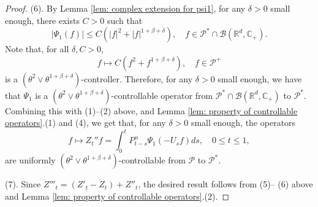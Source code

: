 \documentclass[12pt,a4paper]{amsart}
\theoremstyle{plain}
\theoremstyle{definition}
\numberwithin{equation}{section}
\begin{document}
\begin{proof}
  (6). By  Lemma \ref{lem: complex extension for psi1}, for any $\delta > 0$ small enough, there exists  $C>0$ such that
  \[
    |\Psi_1(f)|
    \le C(|f|^2+|f|^{1+\beta+ \delta})
    , \quad f\in \mathcal P^*\cap\mathcal B(\mathbb R^d, \mathbb C_+).
  \]
  Note that, for all $\delta, C>0$,
  \[
    f \mapsto C(f^2+f^{1+\beta+\delta})
    , \quad f\in \mathcal P^+
  \]
  is a $(\theta^2 \vee \theta^{1+\beta+\delta})$-controller.
  Therefore, for any $\delta > 0$ small enough, we have that $\Psi_1$ is a $(\theta^2 \vee \theta^{1+\beta+\delta})$-controllable operator from $\mathcal P^*\cap\mathcal B(\mathbb R^d, \mathbb C_+)$ to $\mathcal P^*$.
  Combining  this with  (1)--(2) above, 
  and Lemma \ref{lem: property of controllable operators}.(1) and (4), we get that, for any $\delta > 0$ small enough, the operators
  \[
    f
    \mapsto Z_t'' f
    = \int_0^t P_{t-s}^\alpha \Psi_1(-U_sf)ds
    , \quad 0\leq t\leq 1,
  \]
  are uniformly $(\theta^2 \vee \theta^{1+\beta+\delta})$-controllable from $\mathcal P$ to $\mathcal P^*$.
  
  (7). Since $Z'''_t = (Z'_t-Z_t)+Z''_t$, the desired result follows from (5)-- (6) above and Lemma \ref{lem: property of controllable operators}.(2).
\end{proof}
\end{document}
